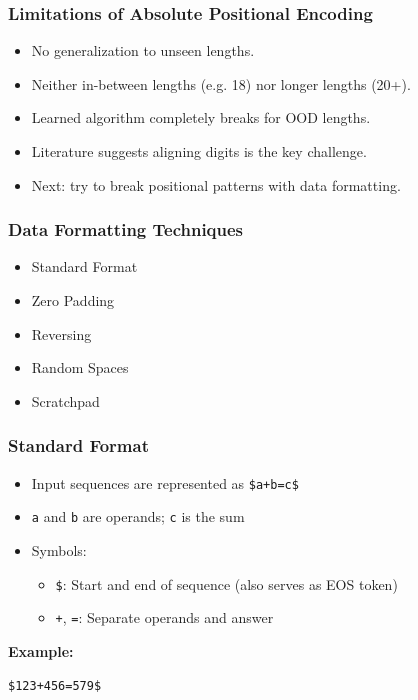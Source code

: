 \documentclass[14pt,aspectratio=169]{beamer}
\theoremstyle{remark}
\begin{document}
\begin{frame}
    \frametitle{Limitations of Absolute Positional Encoding}
    \begin{itemize}
        \item No generalization to unseen lengths.
        \item Neither in-between lengths (e.g. 18) nor longer lengths (20+).
        \item Learned algorithm completely breaks for OOD lengths.
        \item Literature suggests aligning digits is the key challenge.
        \item Next: try to break positional patterns with data formatting.
    \end{itemize}
\end{frame}

\begin{frame}
    \frametitle{Data Formatting Techniques}
    \begin{itemize}
        \item Standard Format
        \item Zero Padding
        \item Reversing
        \item Random Spaces
        \item Scratchpad
    \end{itemize}
\end{frame}

\begin{frame}
    \frametitle{Standard Format}
    \begin{itemize}
        \item Input sequences are represented as \texttt{\$a+b=c\$}
        \item \texttt{a} and \texttt{b} are operands; \texttt{c} is the sum
        \item Symbols:
              \begin{itemize}
                  \item \texttt{\$}: Start and end of sequence (also serves as EOS token)
                  \item \texttt{+}, \texttt{=}: Separate operands and answer
              \end{itemize}
    \end{itemize}
    \vspace{0.5em}
    \textbf{Example:}
    \begin{center}
        \texttt{\$123+456=579\$}
    \end{center}
\end{frame}
\end{document}
